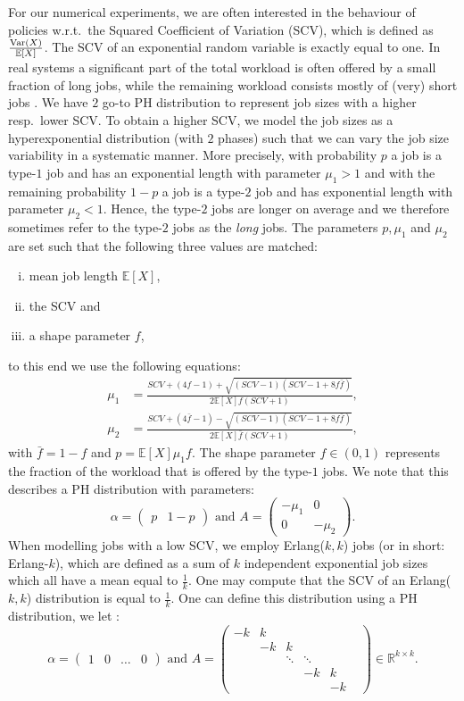 \documentclass[12pt]{report}
\newcommand{\E}{\mathbb{E}}
\newcommand{\R}{\mathbb{R}}
\begin{document}
For our numerical experiments, we are often interested in the behaviour of policies w.r.t.~the Squared Coefficient of Variation (SCV), which is defined as $\frac{\textup{Var}(X)}{\E[X]}$. The SCV of an exponential random variable is exactly equal to one. In real systems a significant part of the total workload is often offered by a small
fraction of long jobs, while the remaining workload consists mostly of (very) short jobs \cite{Sparrow}. We have $2$ go-to PH distribution to represent job sizes with a higher resp.~lower SCV. To obtain a higher SCV, we model the job sizes as a hyperexponential distribution (with $2$ phases) such that we can vary the job size variability in a systematic manner.
More precisely, with probability $p$ a job is a type-$1$ job and has an exponential length with parameter $\mu_1 > 1$ and with the remaining probability $1-p$ a job is a type-$2$ job and
has exponential length with parameter $\mu_2 < 1$. Hence, the type-$2$ jobs are longer on average
and we therefore sometimes refer to the type-$2$ jobs as the {\it long} jobs. 
The parameters $p, \mu_1$ and $\mu_2$ are set such that the following three values are matched: 
\begin{enumerate}[(i)]
	\item mean job length  $\E[X]$,
	\item the SCV and
	\item a shape parameter $f$,
\end{enumerate}
to this end we use the following equations:
\begin{align*}
	\mu_{1} &= \frac{SCV+(4f-1)+\sqrt{(SCV-1)(SCV-1+8f\bar f)}}{2\E[X]f(SCV+1)},\\
	\mu_{2} &= \frac{SCV+(4\bar f-1)-\sqrt{(SCV-1)(SCV-1+8f\bar f)}}{2\E[X]\bar f(SCV+1)}, 
\end{align*}
with $\bar f = 1-f$  and $p =\E[X] \mu_1 f$. 
The shape parameter $f \in (0,1)$ represents the fraction of the workload that is offered by the type-$1$ jobs. We note that this describes a PH distribution with parameters:
$$
\alpha=\begin{pmatrix}
	p & 1-p
\end{pmatrix}
\mbox{ and }
A=\begin{pmatrix}
	-\mu_1 & 0\\
	0 & -\mu_2
\end{pmatrix}.
$$
When modelling jobs with a low SCV, we employ Erlang($k,k$) jobs (or in short: Erlang-$k$), which are defined as a sum of $k$ independent exponential job sizes which all have a mean equal to $\frac{1}{k}$. One may compute that the SCV of an Erlang($k,k$) distribution is equal to $\frac{1}{k}$. One can define this distribution using a PH distribution, we let :
$$
\alpha=\begin{pmatrix}
	1 & 0 & \dots & 0
\end{pmatrix}
\mbox{ and }
A=\begin{pmatrix}
	-k & k &  &  &  & \\
	& -k & k &  &  & \\
	&  & \ddots & \ddots & \\
	&  &  & -k & k\\
	&  &  &  & -k 
\end{pmatrix} \in \R^{k \times k}.
$$
\end{document}
